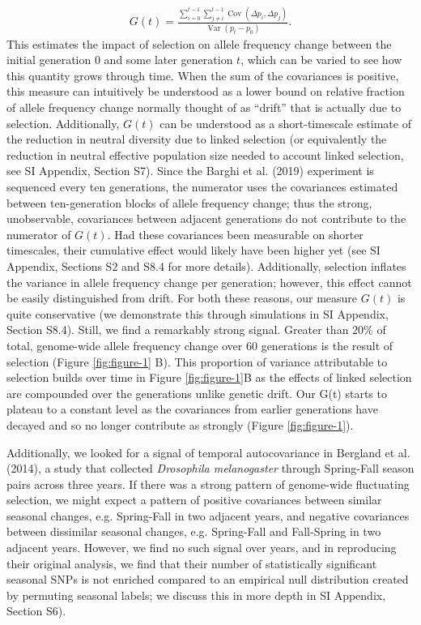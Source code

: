 \documentclass[9pt,twocolumn,twoside]{pnas-new}
\DeclareMathOperator{\var}{Var}
\DeclareMathOperator{\cov}{Cov}
\begin{document}
\begin{align}
  G(t) = \frac{ \sum_{i=0}^{t-1} \sum_{j \ne i}^{t-1} \cov(\Delta p_i, \Delta p_j)}{\var(p_t - p_0)}.
\end{align}
%
This estimates the impact of selection on allele frequency change between the
initial generation $0$ and some later generation $t$, which can be varied to
see how this quantity grows through time. When the sum of the covariances is
positive, this measure can intuitively be understood as a lower bound on
relative fraction of allele frequency change normally thought of as ``drift''
that is actually due to selection. Additionally, $G(t)$ can be understood as a
short-timescale estimate of the reduction in neutral diversity due to linked
selection (or equivalently the reduction in neutral effective population size
needed to account linked selection, see SI Appendix, Section S7). Since the
Barghi et al. (2019) experiment is sequenced every ten generations, the
numerator uses the covariances estimated between ten-generation blocks of
allele frequency change; thus the strong, unobservable, covariances between
adjacent generations do not contribute to the numerator of $G(t)$. Had these
covariances been measurable on shorter timescales, their cumulative effect
would likely have been higher yet (see SI Appendix, Sections S2 and
S8.4 for more details).  Additionally, selection inflates the variance in
allele frequency change per generation; however, this effect cannot be easily
distinguished from drift. For both these reasons, our measure $G(t)$ is quite
conservative (we demonstrate this through simulations in SI Appendix, Section
S8.4).  Still, we find a remarkably strong signal. Greater than $20\%$ of
total, genome-wide allele frequency change over 60 generations is the result of
selection (Figure \ref{fig:figure-1} B). This proportion of variance
attributable to selection builds over time in Figure \ref{fig:figure-1}B as the
effects of linked selection are compounded over the generations unlike genetic
drift. Our G(t) starts to plateau to a constant level as the covariances from
earlier generations have decayed and so no longer contribute as strongly
(Figure \ref{fig:figure-1}).

Additionally, we looked for a signal of temporal autocovariance in Bergland et
al. (2014), a study that collected \emph{Drosophila melanogaster} through
Spring-Fall season pairs across three years. If there was a strong  pattern of
genome-wide fluctuating selection, we might expect a pattern of positive
covariances between similar seasonal changes, e.g.  Spring-Fall in two adjacent
years, and negative covariances between dissimilar seasonal changes, e.g.
Spring-Fall and Fall-Spring in two adjacent years.  However, we find no such
signal over years, and in reproducing their original analysis, we find that
their number of statistically significant seasonal SNPs is not enriched
compared to an empirical null distribution created by permuting seasonal
labels; we discuss this in more depth in SI Appendix, Section S6).
\end{document}

